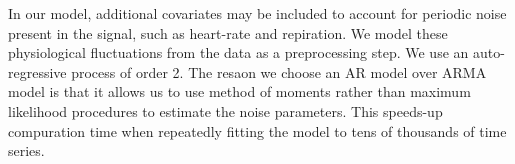 In our model, additional covariates may be included to account for periodic
noise present in the signal, such as heart-rate and repiration. We model these
physiological fluctuations from the data as a preprocessing step. We use an
auto-regressive process of order 2. The resaon we choose an AR model over ARMA
model is that it allows us to use method of moments rather than maximum
likelihood procedures to estimate the noise parameters. This speeds-up
compuration time when repeatedly fitting the model to tens of thousands of time
series. 




